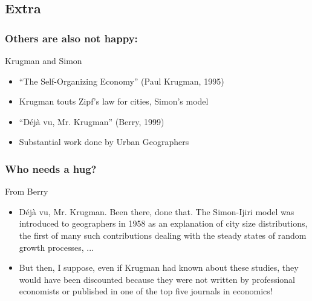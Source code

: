 \subsection{Extra}

\begin{frame}
  \frametitle{Others are also not happy:}

  \begin{block}{Krugman and Simon}
    \begin{itemize}
    \item<1-> ``The Self-Organizing Economy'' (Paul Krugman, 1995)\cite{krugman1995a}
    \item<2-> Krugman touts Zipf's law for cities, Simon's model
    \item<3-> ``D\'{e}j\`{a} vu, Mr. Krugman'' (Berry, 1999)
    \item<4-> Substantial work done by Urban Geographers 
    \end{itemize}
  \end{block}

\end{frame}

\begin{frame}
  \frametitle{Who needs a hug?}

  \begin{block}{From Berry\cite{berry1999a}}
    \begin{itemize}
    \item<1->
      D\'{e}j\`{a} vu, Mr. Krugman. Been there, done that. The Simon-Ijiri model was introduced 
      to geographers in 1958 as an explanation of city size distributions, the first of many such 
      contributions dealing with the steady states of random growth processes, ...
    \item<2->
      But then, I suppose, even if Krugman 
      had known about these studies, they would have been discounted because they were not 
      written by professional economists or published in one of the top five journals in economics!  
    \end{itemize}
    \end{block}

\end{frame}

